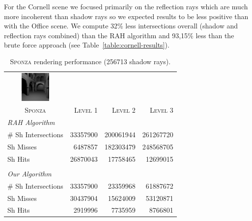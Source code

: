 For the Cornell scene we focused primarily on the reflection rays which are much more incoherent than shadow rays so we expected results to be less positive than with the Office scene. We compute 32\% less intersections overall (shadow and reflection rays combined) than the RAH algorithm and 93,15\% less than the brute force approach (see Table~\ref{table:cornell-results}).

\begin{table}[!htb]
\begin{center}
\fontsize{7}{9}
\selectfont
\begin{tabular}{l|rrr}
    \multicolumn{1}{c}{\includegraphics[width=1.5cm]{Images/Sponza_Preview}} & & \\
    \multicolumn{1}{c|}{\textsc{Sponza}} & \textsc{Level 1} & \textsc{Level 2} & \textsc{Level 3}\\
    \hline
    \emph{RAH Algorithm} & & \\
    \hline
    \quad \# Sh Intersections  & 33357900	 & 200061944    & 261267720  \\
    \quad Sh Misses            & 6487857	 & 182303479    & 248568705	 \\
    \quad Sh Hits              & 26870043	 & 17758465	    & 12699015	 \\

    & & \\

    \hline
    \emph{Our Algorithm} & & \\
    \hline    
    \quad \# Sh Intersections  & 33357900	& 23359968	& 61887672	 \\
    \quad Sh Misses            & 30437904	& 15624009	& 53120871	 \\
    \quad Sh Hits              & 2919996	& 7735959	& 8766801	 \\
\end{tabular}
\end{center}
\caption{\label{table:sponza-results}
\textsc{Sponza} rendering performance (256713 shadow rays).}
\end{table}

